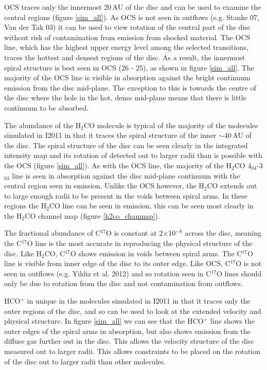 \documentclass[useAMS,usenatbib]{mn2e}
\begin{document}
OCS traces only the innermost 20$\,$AU of the disc and can be used to examine the central regions (figure \ref{sim_all}). As OCS is not seen in outflows (e.g. Stanke 07, Van der Tak 03) it can be used to view rotation of the central part of the disc without risk of contamination from emission from shocked material. The OCS line, which has the highest upper energy level among the selected transitions, traces the hottest and densest regions of the disc. As a result, the innermost spiral structure is best seen in OCS (26 - 25), as shown in figure \ref{sim_all}. The majority of the OCS line is visible in absorption against the bright continuum emission from the disc mid-plane. The exception to this is towards the centre of the disc where the hole in the hot, dense mid-plane means that there is little continuum to be absorbed.\newline

The abundance of the H$_2$CO molecule is typical of the majority of the molecules simulated in I2011 in that it traces the spiral structure of the inner $\sim$40$\,$AU of the disc. The spiral structure of the disc can be seen clearly in the integrated intensity map and its rotation of detected out to larger radii than is possible with the OCS (figure \ref{sim_all}). As with the OCS line, the majority of the H$_2$CO 4$_{04}$-3$_{03}$ line is seen in absorption against the disc mid-plane continuum with the central region seen in emission. Unlike the OCS however, the H$_2$CO extends out to large enough radii to be present in the voids between spiral arms. In these regions the H$_2$CO line can be seen in emission, this can be seen most clearly in the H$_2$CO channel map (figure \ref{h2co_chanmap}).\newline

The fractional abundance of C$^{17}$O is constant at 2$\times$10$^{-8}$ across the disc, meaning the C$^{17}$O line is the most accurate in reproducing the physical structure of the disc. Like H$_2$CO, C$^{17}$O shows emission in voids between spiral arms. The C$^{17}$O line is visible from inner edge of the disc to its outer edge. Like OCS, C$^{17}$O is not seen in outflows (e.g. Yildiz et al. 2012) and so rotation seen in C$^{17}$O lines should only be due to rotation from the disc and not contamination from outflows.\newline

HCO$^+$ in unique in the molecules simulated in I2011 in that it traces only the outer regions of the disc, and so can be used to look at the extended velocity and physical structure. In figure \ref{sim_all} we can see that the HCO$^+$ line shows the outer edges of the spiral arms in absorption, but also shows emission from the diffuse gas further out in the disc. This allows the velocity structure of the disc measured out to larger radii. This allows constraints to be placed on the rotation of the disc out to larger radii than other molecules. 
\end{document}
